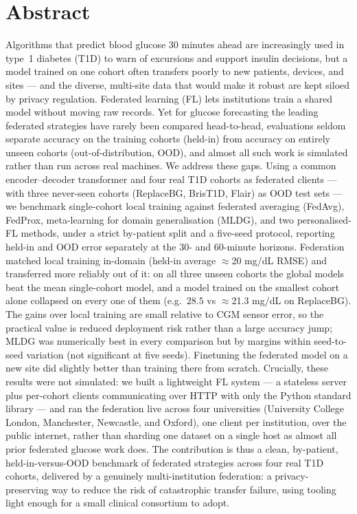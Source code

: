 \documentclass[10pt,letterpaper]{article}
\begin{document}
\section*{Abstract}
Algorithms that predict blood glucose 30 minutes ahead are increasingly used in
type~1 diabetes (T1D) to warn of excursions and support insulin decisions, but a
model trained on one cohort often transfers poorly to new patients, devices, and
sites --- and the diverse, multi-site data that would make it robust are kept
siloed by privacy regulation. Federated learning (FL) lets institutions train a
shared model without moving raw records. Yet for glucose forecasting the leading
federated strategies have rarely been compared head-to-head, evaluations seldom
separate accuracy on the training cohorts (held-in) from accuracy on entirely
unseen cohorts (out-of-distribution, OOD), and almost all such work is simulated
rather than run across real machines. We address these gaps. Using a common
encoder--decoder transformer and four real T1D cohorts as federated clients ---
with three never-seen cohorts (ReplaceBG, BrisT1D, Flair) as OOD test sets --- we
benchmark
single-cohort local training against federated averaging (FedAvg), FedProx,
meta-learning for domain generalisation (MLDG), and two personalised-FL methods,
under a strict by-patient split and a five-seed protocol, reporting held-in and
OOD error separately at the 30- and 60-minute horizons. Federation matched local
training
in-domain (held-in average $\approx$20 mg/dL RMSE) and transferred more reliably
out of it: on all three unseen cohorts the global models beat the mean
single-cohort model, and a model trained on the smallest
cohort alone collapsed on every one of them (e.g.\ $28.5$ vs $\approx$21.3 mg/dL
on ReplaceBG). The gains over local training are small relative to CGM sensor
error, so the practical value is reduced deployment risk rather than a large
accuracy jump; MLDG was numerically best in every comparison but by margins
within seed-to-seed variation (not significant at five seeds). Finetuning the federated model on a new site
did slightly better than training there from scratch. Crucially, these results
were not simulated: we built a lightweight FL system --- a stateless server plus
per-cohort clients communicating over HTTP with only the Python standard library
--- and ran the federation live across four universities (University College
London, Manchester, Newcastle, and Oxford), one client per institution, over the
public internet, rather than sharding one dataset on a single host as almost all
prior federated glucose work does. The contribution is thus a clean, by-patient,
held-in-versus-OOD benchmark of federated strategies across four real T1D cohorts,
delivered by a genuinely multi-institution federation: a privacy-preserving way to
reduce the risk of catastrophic transfer failure, using tooling light enough for a
small clinical consortium to adopt.
\end{document}
